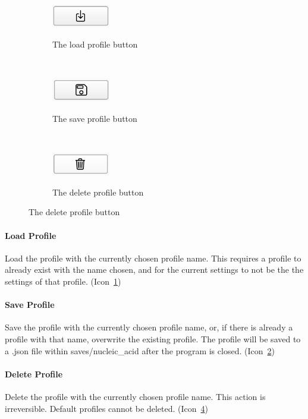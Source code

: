 \documentclass[titlepage]{article}
\begin{document}
	\begin{figure}
		\caption{Various Profile Actions}
		
		\centering
		\begin{subfigure}{.3\textwidth}
			\centering
			\caption{The load profile button}
			\includegraphics[width=1in]{load-profile-button.png}
			\label{fig:load-profile-button}
		\end{subfigure}%
		~
		\begin{subfigure}{.3\textwidth}
			\centering
			\caption{The save profile button}
			\includegraphics[width=1in]{save-profile-button.png}
			\label{fig:save-profile-button}
		\end{subfigure}%
		~
		\begin{subfigure}{.3\textwidth}
			\centering
			\caption{The delete profile button}
			\includegraphics[width=1in]{delete-profile-button.png}
			\label{fig:delete-profile-button}
		\end{subfigure}
	\end{figure}
	
	\paragraph{Load Profile}
	Load the profile with the currently chosen profile name. This requires a profile to already exist with the name chosen, and for the current settings to not be the  the settings of that profile. (Icon~\ref{fig:load-profile-button})
	
	\paragraph{Save Profile}
	Save the profile with the currently chosen profile name, or, if there is already a profile with that name, overwrite the existing profile. The profile will be saved to a .json file within saves/nucleic\_acid after the program is closed. (Icon~\ref{fig:save-profile-button})
	
	\paragraph{Delete Profile}
	Delete the profile with the currently chosen profile name. This action is irreversible. Default profiles cannot be deleted. (Icon~\ref{fig:delete-profile-button})
\end{document}
